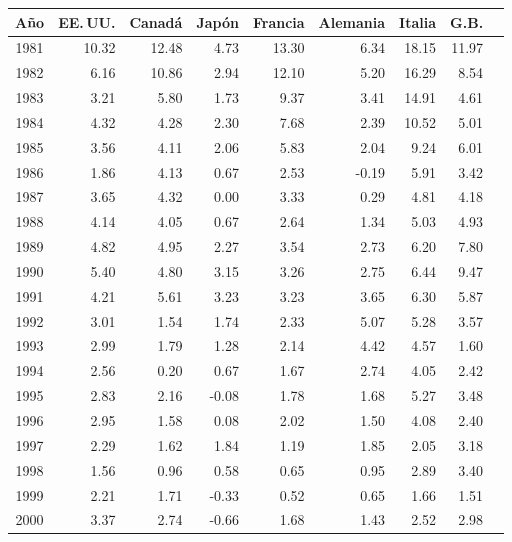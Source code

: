 \documentclass[12pt, letterpaper]{article}
\theoremstyle{remark}
\begin{document}
\begin{datebox}
\small\centering
\captionsetup{type=table}
\vspace{4pt}
\begin{tabular}{crrrrrrrr}
\toprule
\textbf{A\~no} & \textbf{EE.\,UU.} & \textbf{Canad\'a} & \textbf{Jap\'on} & \textbf{Francia} & \textbf{Alemania} & \textbf{Italia} & \textbf{G.B.} \\
\midrule
1981 & 10.32 & 12.48 &  4.73 & 13.30 &  6.34 & 18.15 & 11.97 \\
1982 &  6.16 & 10.86 &  2.94 & 12.10 &  5.20 & 16.29 &  8.54 \\
1983 &  3.21 &  5.80 &  1.73 &  9.37 &  3.41 & 14.91 &  4.61 \\
1984 &  4.32 &  4.28 &  2.30 &  7.68 &  2.39 & 10.52 &  5.01 \\
1985 &  3.56 &  4.11 &  2.06 &  5.83 &  2.04 &  9.24 &  6.01 \\
1986 &  1.86 &  4.13 &  0.67 &  2.53 & -0.19 &  5.91 &  3.42 \\
1987 &  3.65 &  4.32 &  0.00 &  3.33 &  0.29 &  4.81 &  4.18 \\
1988 &  4.14 &  4.05 &  0.67 &  2.64 &  1.34 &  5.03 &  4.93 \\
1989 &  4.82 &  4.95 &  2.27 &  3.54 &  2.73 &  6.20 &  7.80 \\
1990 &  5.40 &  4.80 &  3.15 &  3.26 &  2.75 &  6.44 &  9.47 \\
1991 &  4.21 &  5.61 &  3.23 &  3.23 &  3.65 &  6.30 &  5.87 \\
1992 &  3.01 &  1.54 &  1.74 &  2.33 &  5.07 &  5.28 &  3.57 \\
1993 &  2.99 &  1.79 &  1.28 &  2.14 &  4.42 &  4.57 &  1.60 \\
1994 &  2.56 &  0.20 &  0.67 &  1.67 &  2.74 &  4.05 &  2.42 \\
1995 &  2.83 &  2.16 & -0.08 &  1.78 &  1.68 &  5.27 &  3.48 \\
1996 &  2.95 &  1.58 &  0.08 &  2.02 &  1.50 &  4.08 &  2.40 \\
1997 &  2.29 &  1.62 &  1.84 &  1.19 &  1.85 &  2.05 &  3.18 \\
1998 &  1.56 &  0.96 &  0.58 &  0.65 &  0.95 &  2.89 &  3.40 \\
1999 &  2.21 &  1.71 & -0.33 &  0.52 &  0.65 &  1.66 &  1.51 \\
2000 &  3.37 &  2.74 & -0.66 &  1.68 &  1.43 &  2.52 &  2.98 \\

\end{tabular}
\end{datebox}
\end{document}
